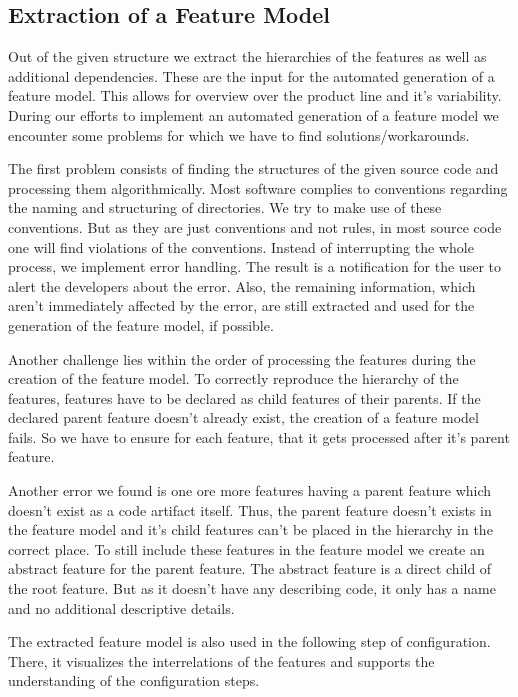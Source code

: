 \subsection{Extraction of a Feature Model}
Out of the given structure we extract the hierarchies of the features as well as additional dependencies. These are the input for the automated generation of a feature model. This allows for overview over the product line and it's variability. During our efforts to implement an automated generation of a feature model we encounter some problems for which we have to find solutions/workarounds.

The first problem consists of finding the structures of the given source code and processing them algorithmically. Most software complies to conventions regarding the naming and structuring of directories. We try to make use of these conventions. But as they are just conventions and not rules, in most source code one will find violations of the conventions. Instead of interrupting the whole process, we implement error handling. The result is a notification for the user to alert the developers about the error. Also, the remaining information, which aren't immediately affected by the error, are still extracted and used for the generation of the feature model, if possible.

Another challenge lies within the order of processing the features during the creation of the feature model. To correctly reproduce the hierarchy of the features, features have to be declared as child features of their parents. If the declared parent feature doesn't already exist, the creation of a feature model fails. So we have to ensure for each feature, that it gets processed after it's parent feature.

Another error we found is one ore more features having a parent feature which doesn't exist as a code artifact itself. Thus, the parent feature doesn't exists in the feature model and it's child features can't be placed in the hierarchy in the correct place. To still include these features in the feature model we create an abstract feature for the parent feature. The abstract feature is a direct child of the root feature. But as it doesn't have any describing code, it only has a name and no additional descriptive details.

The extracted feature model is also used in the following step of configuration. There, it visualizes the interrelations of the features and supports the understanding of the configuration steps.

